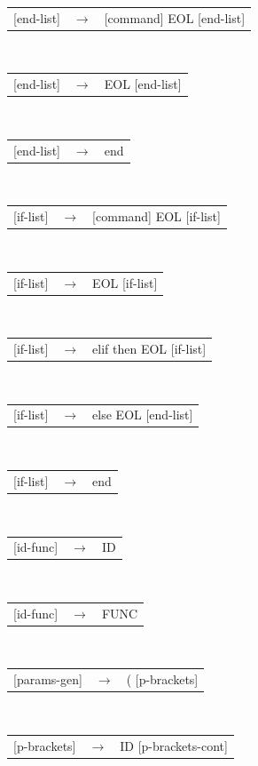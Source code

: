 \documentclass[11pt, a4paper]{article}
\begin{document}
\begin{algorithm}[H]
  \begin{tabularx}{\textwidth}{l>{$}c<{$}X}
  {[end-list]}  &\rightarrow& [command] EOL [end-list]
\end{tabularx}\\ 
  \begin{tabularx}{\textwidth}{l>{$}c<{$}X}
  {[end-list]}  &\rightarrow& EOL [end-list]
\end{tabularx}\\ 
  \begin{tabularx}{\textwidth}{l>{$}c<{$}X}
  {[end-list]}  &\rightarrow& end
\end{tabularx}\\ 
  \begin{tabularx}{\textwidth}{l>{$}c<{$}X}
  {[if-list]}  &\rightarrow& [command] EOL [if-list]
\end{tabularx}\\ 
  \begin{tabularx}{\textwidth}{l>{$}c<{$}X}
  {[if-list]}  &\rightarrow& EOL [if-list]
\end{tabularx}\\ 
  \begin{tabularx}{\textwidth}{l>{$}c<{$}X}
  {[if-list]}  &\rightarrow& elif then EOL [if-list]
\end{tabularx}\\ 
  \begin{tabularx}{\textwidth}{l>{$}c<{$}X}
  {[if-list]}  &\rightarrow& else EOL [end-list]
\end{tabularx}\\ 
  \begin{tabularx}{\textwidth}{l>{$}c<{$}X}
  {[if-list]}  &\rightarrow& end 
\end{tabularx}\\ 
  \begin{tabularx}{\textwidth}{l>{$}c<{$}X}
  {[id-func]}    &\rightarrow& ID
\end{tabularx}\\ 
  \begin{tabularx}{\textwidth}{l>{$}c<{$}X}
  {[id-func]}    &\rightarrow& FUNC
\end{tabularx}\\ 
  \begin{tabularx}{\textwidth}{l>{$}c<{$}X}
  {[params-gen]} &\rightarrow& ( [p-brackets] 
\end{tabularx}\\ 
  \begin{tabularx}{\textwidth}{l>{$}c<{$}X}
  {[p-brackets]}   &\rightarrow& ID [p-brackets-cont] 

\end{tabularx}
\end{algorithm}
\end{document}
